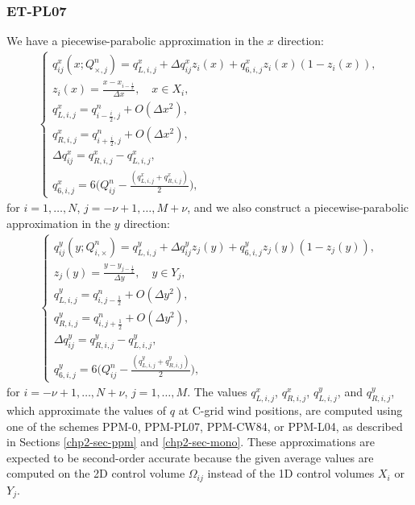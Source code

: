 \subsubsection{ET-PL07}
We have a piecewise-parabolic approximation in the $x$ direction:
\begin{align}
	\label{chp5-ppmx-eq1-pl07}
	\begin{cases}
		q_{ij}^x(x;Q_{\times, j}^n) = q_{L,i,j}^x + \Delta q_{ij}^x z_i(x) + q_{6, i,j}^xz_i(x)(1-z_i(x)), \\
		z_i(x) = \frac{x-x_{i-\frac{1}{2}}}{\Delta x},
		\quad x \in X_i,\\
		q_{L, i,j}^x = q_{i-\frac{i}{2},j}^n+ O(\Delta x^2),\\
		q_{R, i,j}^x = q_{i+\frac{i}{2},j}^n+ O(\Delta x^2),\\
		\Delta q_{ij}^x = q_{R, i,j}^x - q_{L, i,j}^x,\\
		q_{6,i,j}^x = 6\bigg(Q_{ij}^n - \frac{(q_{L,i,j}^x + q_{R,i,j}^x)}{2}\bigg),
	\end{cases}
\end{align}
for $i=1, \ldots, N$, $j=-\nu+1, \ldots, M + \nu$, and we also construct a piecewise-parabolic
approximation in the $y$ direction:
\begin{align}
	\label{chp5-ppmy-pl07}
	\begin{cases}
		q_{ij}^y(y;Q_{i,\times}^n) = q_{L,i,j}^y + \Delta q_{ij}^y z_j(y) + q_{6, i,j}^yz_j(y)(1-z_j(y)),\\ 
		z_j(y) = \frac{y-y_{j-\frac{1}{2}}}{\Delta y},
		\quad y \in Y_j,\\
		q_{L, i,j}^y = q_{i,j-\frac{1}{2}}^n+ O(\Delta y^2),\\
		q_{R, i,j}^y = q_{i,j+\frac{1}{2}}^n+ O(\Delta y^2),\\
		\Delta q_{ij}^y = q_{R, i,j}^y - q_{L, i,j}^y,\\
		q_{6,i,j}^y = 6\bigg(Q_{ij}^n - \frac{(q_{L,i,j}^y + q_{R,i,j}^y)}{2}\bigg),
	\end{cases}
\end{align}
for $i=-\nu+1, \ldots, N + \nu$, $j=1, \ldots, M$.
The values $q_{L,i,j}^x$, $q_{R,i,j}^x$, $q_{L,i,j}^y$, and $q_{R,i,j}^y$,
which approximate the values of $q$ at C-grid wind positions, are computed
using one of the schemes PPM-0, PPM-PL07, PPM-CW84, or PPM-L04, as described
in Sections \ref{chp2-sec-ppm} and \ref{chp2-sec-mono}.
These approximations are expected to be
second-order accurate because the given average values are computed on the
2D control volume $\Omega_{ij}$ instead of the 1D control volumes $X_i$ or $Y_j$.

